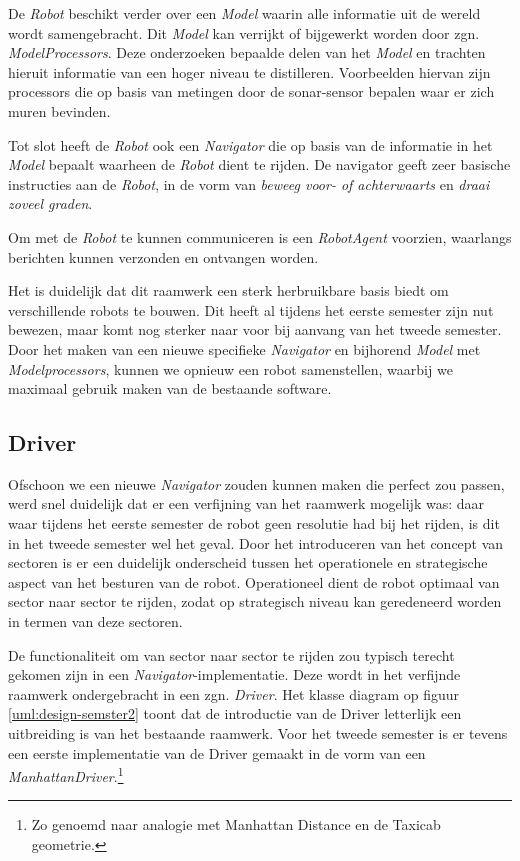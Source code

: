 \documentclass[12pt,a4paper]{report}
\begin{document}
De \emph{Robot} beschikt verder over een \emph{Model} waarin alle informatie uit de wereld wordt samengebracht. Dit \emph{Model} kan verrijkt of bijgewerkt worden door zgn. \emph{ModelProcessors}. Deze onderzoeken bepaalde delen van het \emph{Model} en trachten hieruit informatie van een hoger niveau te distilleren. Voorbeelden hiervan zijn processors die op basis van metingen door de sonar-sensor bepalen waar er zich muren bevinden.

Tot slot heeft de \emph{Robot} ook een \emph{Navigator} die op basis van de informatie in het \emph{Model} bepaalt waarheen de \emph{Robot} dient te rijden. De navigator geeft zeer basische instructies aan de \emph{Robot}, in de vorm van \emph{beweeg voor- of achterwaarts} en \emph{draai zoveel graden}.

Om met de \emph{Robot} te kunnen communiceren is een \emph{RobotAgent} voorzien, waarlangs berichten kunnen verzonden en ontvangen worden.

Het is duidelijk dat dit raamwerk een sterk herbruikbare basis biedt om verschillende robots te bouwen. Dit heeft al tijdens het eerste semester zijn nut bewezen, maar komt nog sterker naar voor bij aanvang van het tweede semester. Door het maken van een nieuwe specifieke \emph{Navigator} en bijhorend \emph{Model} met \emph{Modelprocessors}, kunnen we opnieuw een robot samenstellen, waarbij we maximaal gebruik maken van de bestaande software.

\subsection{Driver}

Ofschoon we een nieuwe \emph{Navigator} zouden kunnen maken die perfect zou passen, werd snel duidelijk dat er een verfijning van het raamwerk mogelijk was: daar waar tijdens het eerste semester de robot geen resolutie had bij het rijden, is dit in het tweede semester wel het geval. Door het introduceren van het concept van sectoren is er een duidelijk onderscheid tussen het operationele en strategische aspect van het besturen van de robot. Operationeel dient de robot optimaal van sector naar sector te rijden, zodat op strategisch niveau kan geredeneerd worden in termen van deze sectoren.

De functionaliteit om van sector naar sector te rijden zou typisch terecht gekomen zijn in een \emph{Navigator}-implementatie. Deze wordt in het verfijnde raamwerk ondergebracht in een zgn. \emph{Driver}. Het klasse diagram op figuur \ref{uml:design-semster2} toont dat de introductie van de Driver letterlijk een uitbreiding is van het bestaande raamwerk. Voor het tweede semester is er tevens een eerste implementatie van de Driver gemaakt in de vorm van een \emph{ManhattanDriver}.\footnote{Zo genoemd naar analogie met Manhattan Distance en de Taxicab geometrie.} 
\end{document}

